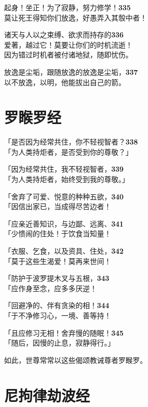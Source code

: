 起身！坐正！为了寂静，努力修学！\hfill{\grayfootnotesize \textbf{335}} \\
莫让死王得知你们放逸，好愚弄入其彀中者！


诸天与人以之束缚、欲求而持存的\hfill{\grayfootnotesize \textbf{336}} \\
爱著，越过它！莫要让你们的时机流逝！\\
因为错过时机者被付诸地狱，随即忧伤。


放逸是尘垢，跟随放逸的放逸是尘垢，\hfill{\grayfootnotesize \textbf{337}} \\
以不放逸，以明，他能拔出自己的箭。


\section{罗睺罗经}

「是否因为经常共住，你不轻视智者？\hfill{\grayfootnotesize \textbf{338}} \\
「为人类持炬者，是否受到你的尊敬？」


「因为经常共住，我不轻视智者，\hfill{\grayfootnotesize \textbf{339}} \\
「为人类持炬者，始终受到我的尊敬。」


「舍弃了可爱、悦意的种种五欲，\hfill{\grayfootnotesize \textbf{340}} \\
「因信出家已，当成得尽苦边者！


「应亲近善知识，与边鄙、远离、\hfill{\grayfootnotesize \textbf{341}} \\
「少愦闹的住处！于饮食当知量！


「衣服、乞食，以及资具、住处，\hfill{\grayfootnotesize \textbf{342}} \\
「莫于这些生渴爱！莫再来世间！


「防护于波罗提木叉与五根，\hfill{\grayfootnotesize \textbf{343}} \\
「应作身至念，应多多厌逆！


「回避净的、伴有贪染的相！\hfill{\grayfootnotesize \textbf{344}} \\
「于不净修习心，一境、善等持！


「且应修习无相！舍弃慢的随眠！\hfill{\grayfootnotesize \textbf{345}} \\
「随后，因慢的止息，寂静得行。」


如此，世尊常常以这些偈颂教诫尊者罗睺罗。


\section{尼拘律劫波经}

